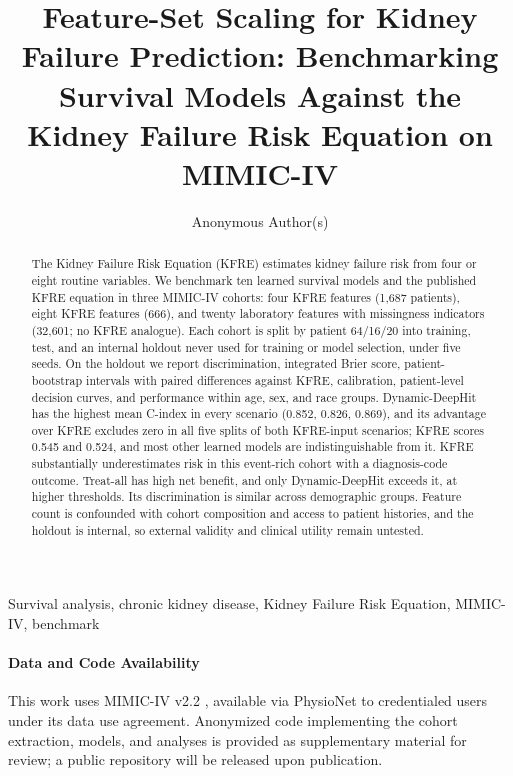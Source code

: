 \documentclass[pmlr,twocolumn,10pt]{jmlr} %
\title[Feature-Set Scaling for Kidney Failure Prediction]{Feature-Set Scaling for Kidney Failure Prediction: Benchmarking Survival Models Against the Kidney Failure Risk Equation on MIMIC-IV}
\author{Anonymous Author(s)}
\begin{document}
\maketitle

\begin{abstract}
The Kidney Failure Risk Equation (KFRE) estimates kidney failure risk from four or eight routine variables. We benchmark ten learned survival models and the published KFRE equation in three MIMIC-IV cohorts: four KFRE features (1{,}687 patients), eight KFRE features (666), and twenty laboratory features with missingness indicators (32{,}601; no KFRE analogue). Each cohort is split by patient 64/16/20 into training, test, and an internal holdout never used for training or model selection, under five seeds. On the holdout we report discrimination, integrated Brier score, patient-bootstrap intervals with paired differences against KFRE, calibration, patient-level decision curves, and performance within age, sex, and race groups. Dynamic-DeepHit has the highest mean C-index in every scenario (0.852, 0.826, 0.869), and its advantage over KFRE excludes zero in all five splits of both KFRE-input scenarios; KFRE scores 0.545 and 0.524, and most other learned models are indistinguishable from it. KFRE substantially underestimates risk in this event-rich cohort with a diagnosis-code outcome. Treat-all has high net benefit, and only Dynamic-DeepHit exceeds it, at higher thresholds. Its discrimination is similar across demographic groups. Feature count is confounded with cohort composition and access to patient histories, and the holdout is internal, so external validity and clinical utility remain untested.
\end{abstract}

\begin{keywords}
Survival analysis, chronic kidney disease, Kidney Failure Risk Equation, MIMIC-IV, benchmark
\end{keywords}

\paragraph*{Data and Code Availability}
This work uses MIMIC-IV v2.2 \citep{mimiciv_v22,johnson2023mimic_ehr}, available via PhysioNet \citep{goldberger2000physionet} to credentialed users under its data use agreement. Anonymized code implementing the cohort extraction, models, and analyses is provided as supplementary material for review; a public repository will be released upon publication.
\end{document}
